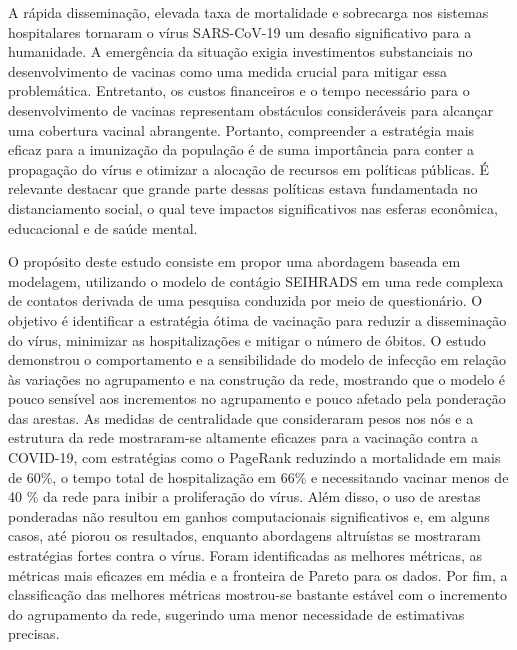 A rápida disseminação, elevada taxa de mortalidade e sobrecarga nos sistemas hospitalares tornaram o vírus SARS-CoV-19 um desafio significativo para a humanidade. A emergência da situação exigia investimentos substanciais no desenvolvimento de vacinas como uma medida crucial para mitigar essa problemática. Entretanto, os custos financeiros e o tempo necessário para o desenvolvimento de vacinas representam obstáculos consideráveis para alcançar uma cobertura vacinal abrangente. Portanto, compreender a estratégia mais eficaz para a imunização da população é de suma importância para conter a propagação do vírus e otimizar a alocação de recursos em políticas públicas. É relevante destacar que grande parte dessas políticas estava fundamentada no distanciamento social, o qual teve impactos significativos nas esferas econômica, educacional e de saúde mental.

O propósito deste estudo consiste em propor uma abordagem baseada em modelagem, utilizando o modelo de contágio SEIHRADS em uma rede complexa de contatos derivada de uma pesquisa conduzida por meio de questionário. O objetivo é identificar a estratégia ótima de vacinação para reduzir a disseminação do vírus, minimizar as hospitalizações e mitigar o número de óbitos. O estudo demonstrou o comportamento e a sensibilidade do modelo de infecção em relação às variações no agrupamento e na construção da rede, mostrando que o modelo é pouco sensível aos incrementos no agrupamento e pouco afetado pela ponderação das arestas. As medidas de centralidade que consideraram pesos nos nós e a estrutura da rede mostraram-se altamente eficazes para a vacinação contra a COVID-19, com estratégias como o PageRank reduzindo a mortalidade em mais de 60\%, o tempo total de hospitalização em 66\% e necessitando vacinar menos de 40 \% da rede para inibir a proliferação do vírus. Além disso, o uso de arestas ponderadas não resultou em ganhos computacionais significativos e, em alguns casos, até piorou os resultados, enquanto abordagens altruístas se mostraram estratégias fortes contra o vírus. Foram identificadas as melhores métricas, as métricas mais eficazes em média e a fronteira de Pareto para os dados. Por fim, a classificação das melhores métricas mostrou-se bastante estável com o incremento do agrupamento da rede, sugerindo uma menor necessidade de estimativas precisas.


